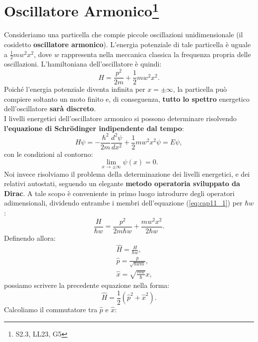 
\chapter[Oscillatore Armonico]{Oscillatore Armonico\footnote{S2.3, LL23, G5}}
Consideriamo una particella che compie piccole oscillazioni unidimensionale (il cosidetto \textbf{oscillatore armonico}). L'energia potenziale di tale particella è uguale a $\frac{1}{2}mw^2x^2$, dove $w$ rappresenta nella meccanica classica la frequenza propria delle oscillazioni. L'hamiltoniana dell'oscillatore è quindi:
\begin{equation}
H=\frac{p^2}{2m}+\frac{1}{2}mw^2x^2.
\label{eq:cap11_1}
\end{equation}
Poiché l'energia potenziale diventa infinita per $x=\pm \infty$, la particella può compiere soltanto un moto finito e, di conseguenza,  \textbf{tutto lo spettro} energetico dell'oscillatore \textbf{sarà discreto}.\\
 I livelli energetici dell'oscillatore armonico si possono determinare risolvendo \textbf{l'equazione di Schr\"{o}dinger indipendente dal tempo}:
\begin{equation}
H\psi= -\frac{\hbar^2}{2m}\frac{d^2\psi}{dx^2}+\frac{1}{2}mw^2x^2\psi=E\psi,
\end{equation}
con le condizioni al contorno:
\begin{equation}
\lim _{x \rightarrow \pm \infty} \psi(x)=0.
\end{equation}
Noi invece risolviamo il problema della determinazione dei livelli energetici, e dei relativi autostati, seguendo un elegante \textbf{metodo operatoria sviluppato da Dirac}.
 A tale scopo è conveniente in primo luogo introdurre degli operatori adimensionali, dividendo entrambe i membri dell'equazione (\ref{eq:cap11_1}) per $\hbar w$:
\begin{equation} \label{eq:cap11_2}
\frac{H}{\hbar w}=\frac{p^2}{2m\hbar w}+\frac{mw^2x^2}{2\hbar w}.
\end{equation}
Definendo allora:
\begin{eqnarray}  
	& &\hat{H}=\frac{H}{\hbar w},  \\
	& &\hat{p}=\frac{p}{\sqrt{\hbar w m}},  \\
	& &\hat{x}= \sqrt{\frac{mw}{\hbar}}x,
\end{eqnarray}
possiamo scrivere la precedente equazione nella forma:
\begin{equation}
\hat{H}=\frac{1}{2} (\hat{p}^2+\hat{x}^2).
\end{equation}
Calcoliamo il commutatore tra $\hat{p}$ e $\hat{x}$:
